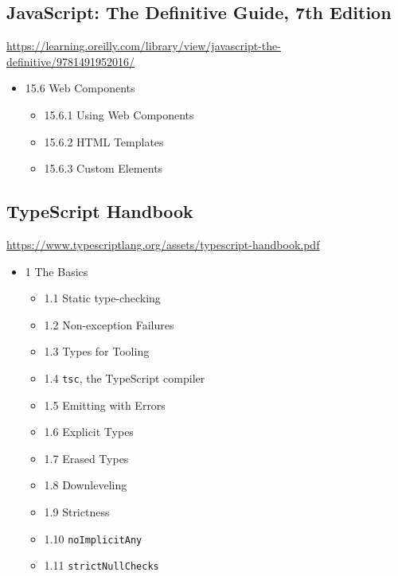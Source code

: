 \begin{mybox}
\section{JavaScript: The Definitive Guide, 7th Edition}
\label{sec:org5a05980}
\tcblower{}
\url{https://learning.oreilly.com/library/view/javascript-the-definitive/9781491952016/}
\end{mybox}\begin{myitems}
\begin{itemize}
\item 15.6 Web Components
\begin{itemize}
\item 15.6.1 Using Web Components
\item 15.6.2 HTML Templates
\item 15.6.3 Custom Elements
\end{itemize}
\end{itemize}
\end{myitems}

\begin{mybox}
\section{TypeScript Handbook}
\label{sec:orgd3cc294}
\tcblower{}
\url{https://www.typescriptlang.org/assets/typescript-handbook.pdf}
\end{mybox}\begin{myitems}
\begin{itemize}
\item 1 The Basics 
\begin{itemize}
\item 1.1 Static type-checking
\item 1.2 Non-exception Failures
\item 1.3 Types for Tooling
\item 1.4 \texttt{tsc}, the TypeScript compiler
\item 1.5 Emitting with Errors
\item 1.6 Explicit Types
\item 1.7 Erased Types
\item 1.8 Downleveling
\item 1.9 Strictness
\item 1.10 \texttt{noImplicitAny}
\item 1.11 \texttt{strictNullChecks}
\end{itemize}
\end{itemize}
\end{myitems}
